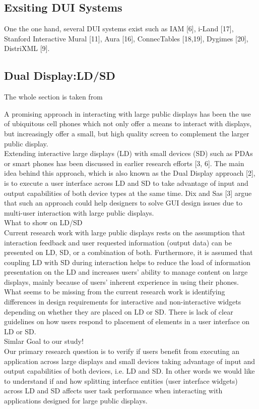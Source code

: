 \subsection{Exsiting DUI Systems}
\cite{demeure20084c} One the one hand, several DUI systems exist such as IAM
[6], i-Land [17], Stanford Interactive Mural [11], Aura [16], ConnecTables [18,19], Dygimes [20], DistriXML [9].

\subsection{Dual Display:LD/SD}
The whole section is taken from \cite{kaviani2011dual}

A promising approach in interacting with large public displays has been the use
of ubiquitous cell phones which not only offer a means to interact with
displays, but increasingly offer a small, but high quality screen to complement
the larger public display.\\

Extending interactive large displays (LD) with small devices (SD) such as PDAs
or smart phones has been discussed in earlier research efforts [3, 6]. The main
idea behind this approach, which is also known as the Dual Display approach [2],
is to execute a user interface across LD and SD to take advantage of input and
output capabilities of both device types at the same time. Dix and Sas [3] argue
that such an approach could help designers to solve GUI design issues due to multi-user interaction with large public displays.\\

What to show on LD/SD\\
Current research work with large public displays rests on the assumption that
interaction feedback and user requested information (output data) can be
presented on LD, SD, or a combination of both. Furthermore, it is assumed that
coupling LD with SD during interaction helps to reduce the load of information presentation on the LD and increases users’ ability to manage content on large displays, mainly because of users’ inherent experience in using their phones. What seems to be missing from the current research work is identifying differences in design requirements for interactive and non-interactive widgets depending on whether they are placed on LD or SD. There is lack of clear guidelines on how users respond to placement of elements in a user interface on LD or SD.\\

Simlar Goal to our study!\\
Our primary research question is to verify if users benefit from executing an
application across large displays and small devices taking advantage of input
and output capabilities of both devices, i.e. LD and SD. In other words we would
like to understand if and how splitting interface entities (user interface widgets) across LD and SD affects user task performance when interacting with applications designed for large public displays.\\

